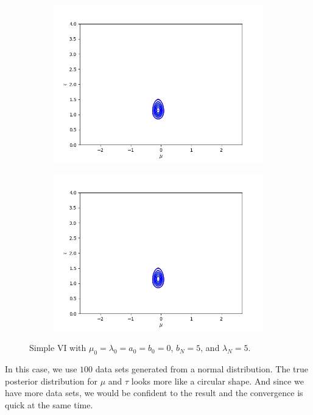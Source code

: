 \documentclass[11pt]{extarticle}
\newcommand{\0}{\mathbf{0}}
\renewcommand{\(}{\left(}
\renewcommand{\)}{\right)}
\theoremstyle{definition}
\begin{document}
\begin{enumerate}
\begin{figure}[!ht]
\begin{subfigure}{.45\textwidth}
			\includegraphics[width=\linewidth]{2_4_3_3}
		\end{subfigure}
		\begin{subfigure}{.45\textwidth}
			\includegraphics[width=\linewidth]{2_4_3_6}
		\end{subfigure}
		\caption{Simple VI with $\mu_{0} = \lambda_{0} = a_{0} = b_{0} = 0$, $b_{N} = 5$, and $\lambda_{N} = 5$.}
		\label{fig:2_4_3}
	\end{figure}
	\par In this case, we use $100$ data sets generated from a normal distribution. The true posterior distribution for $\mu$ and $\tau$ looks more like a circular shape. And since we have more data sets, we would be confident to the result and the convergence is quick at the same time.
\end{enumerate}
\end{document}
